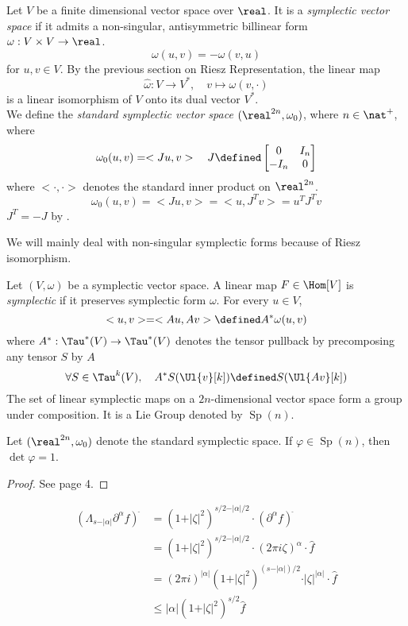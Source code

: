 \documentclass[../main-v2-manifolds.tex]{subfiles}
\begin{document}
\begin{definition}
    Let $V$ be a finite dimensional vector space over $\real$. It is a \emph{symplectic vector space} if it admits a non-singular, antisymmetric billinear form $\omega: V\times V\to \real$.
    \[
        \omega(u,v) = -\omega(v,u)
    \]
    for $u,v\in V$. By the previous section on Riesz Representation, the linear map 
    \[
        \hat{\omega}:V\to V^*,\quad v\mapsto \omega(v,\cdot)
    \]
    is a linear isomorphism of $V$ onto its dual vector $V^*$. \\

    We define the \emph{standard symplectic vector space} $(\real^{2n},\omega_0)$, where $n\in \nat^+$, where 
    \[
        \omega_0(u,v) = <Ju, v>\quad J \defined\begin{bmatrix}
            0    & I_n\\ 
            -I_n & 0
        \end{bmatrix}
    \]
    where $<\cdot,\cdot>$ denotes the standard inner product on $\real^{2n}$. 
    \begin{equation}\label{std-symplectic-form}
        \omega_0(u,v) = <Ju,v> = <u, J^Tv> = u^{T}J^T v
    \end{equation}
    $J^T=-J$ by .
\end{definition}
We will mainly deal with non-singular symplectic forms because of Riesz isomorphism.
\begin{definition}
    Let $(V,\omega)$ be a symplectic vector space. A linear map $F\in \Hom[V]$ is \emph{symplectic} if it preserves symplectic form $\omega$. For every $u\in V$, 
    \[
        <u, v> = <Au, Av> \defined A^*\omega(u,v)
    \]
    where $A^*: \Tau^*(V)\to \Tau^*(V)$ denotes the tensor pullback by precomposing any tensor $S$ by $A$
    \[
        \forall S\in\Tau^k(V),\quad  A^*S(\Ul{v}[k]) \defined S(\Ul{Av}[k])
    \]
    The set of linear symplectic maps on a $2n$-dimensional vector space form a group under composition. It is a Lie Group denoted by $\operatorname{Sp}(n)$.
\end{definition}
\begin{wts}
    Let $(\real^{2n},\omega_0)$ denote the standard symplectic space. If $\varphi\in \operatorname{Sp}(n)$, then $\det \varphi = 1$. 
\end{wts}
\begin{proof}
    See page 4.    
\end{proof}

\begin{align}
(\Lambda_{s-\vert\alpha\vert}\partial^\alpha f)^{\hat{\:}} &= (1+\vert\zeta\vert^2)^{s/2 - \vert\alpha\vert/2}\cdot(\partial^\alpha f)^{\hat{\:}}\\
&= (1+\vert\zeta\vert^2)^{s/2 - \vert\alpha\vert/2}\cdot(2\pi i \zeta)^{\alpha}
\cdot \hat{f}\\
&= (2\pi i)^{\vert\alpha\vert}(1+\vert\zeta\vert^2)^{(s-\vert\alpha\vert)/2}\cdot\vert\zeta\vert^{\vert\alpha\vert}\cdot\hat{f}\\
&\leq{\vert\alpha\vert}(1+\vert\zeta\vert^2)^{s/2}\hat{f}
\end{align}
\end{document}
